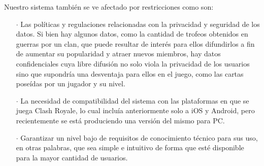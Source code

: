 Nuestro sistema también se ve afectado por restricciones como son:

\begin{enumerate}
  \item[\(\cdot\)] Las políticas y regulaciones relacionadas con la privacidad y seguridad de los datos. Si bien hay algunos datos, como la cantidad de trofeos obtenidos en guerras por un clan, que puede resultar de interés para ellos difundirlos a fin de aumentar su popularidad y atraer nuevos miembros, hay datos confidenciales cuya libre difusión no solo viola la privacidad de los usuarios sino que supondría una desventaja para ellos en el juego, como las cartas poseídas por un jugador y su nivel.
  \item[\(\cdot\)] La necesidad de compatibilidad del sistema con las plataformas en que se juega Clash Royale, lo cual incluía anteriormente solo a iOS y Android, pero recientemente se está produciendo una versión del mismo para PC.
  \item[\(\cdot\)] Garantizar un nivel bajo de requisitos de conocimiento técnico para sus uso, en otras palabras, que sea simple e intuitivo de forma que esté disponible para la mayor cantidad de usuarios. 
\end{enumerate}
